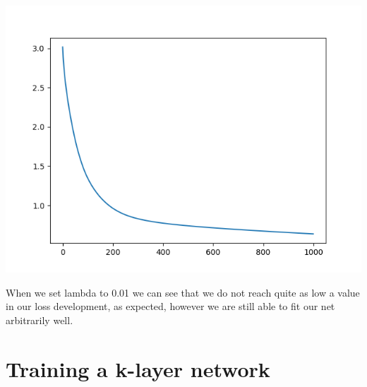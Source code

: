 \documentclass[11pt,a4paper]{article}
\begin{document}
\includegraphics[width=\textwidth]{sanity_check_lambda-01.png}


When we set lambda to 0.01 we can see that we do not reach quite as low a value in our loss development, as expected, however we are still able to fit our net arbitrarily well.


\section{Training a k-layer network}
\end{document}
